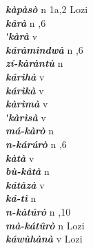 \begin{multicols}{2}
{{\bfseries\itshape kàpàsò}} \relax  n  \relax  1a,2  \relax  Lozi \relax  \\
{{\bfseries\itshape kârà}} \relax  n  ,6  \relax   \relax  \\
{{\bfseries\itshape ʹkàrà}} \relax  v  \relax   \relax  {} \relax   \relax  \\
{{\bfseries\itshape káràmìndwà}} \relax  n  ,6  \relax   \relax  \\
{{\bfseries\itshape zí-kàràntù}} \relax  n   \relax  {} \relax   \relax  \\
{{\bfseries\itshape kárìhà}} \relax  v  \relax   \relax  {} \relax   \relax  \\
{{\bfseries\itshape kárìkà}} \relax  v  \relax   \relax  {} \relax   \relax  \\
{{\bfseries\itshape kàrìmà}} \relax  v  \relax   \relax  {} \relax   \relax  \\
{{\bfseries\itshape ʹkàrìsà}} \relax  v  \relax   \relax  {} \relax   \relax  \\
{{\bfseries\itshape má-kàrò}} \relax  n   \relax  {} \relax   \relax  \\
{{\bfseries\itshape n-kárúrò}} \relax  n  ,6  \relax   \relax  \\
{{\bfseries\itshape kàtà}} \relax  v  \relax   \relax  {} \relax   \relax  \\
{{\bfseries\itshape bù-kâtà}} \relax  n   \relax  {} \relax   \relax  \\
{{\bfseries\itshape kátàzà}} \relax  v  \relax   \relax  {} \relax   \relax  \\
{{\bfseries\itshape ká-tì}} \relax  n   \relax  {} \relax   \relax  \\
{{\bfseries\itshape n-kàtúrò}} \relax  n  ,10  \relax   \relax  \\
{{\bfseries\itshape mà-kátûrò}} \relax  n   \relax  {} \relax  Lozi \relax  \\
{{\bfseries\itshape káwùhànà}} \relax  v  \relax   \relax  {} \relax  Lozi \relax  \\

\end{multicols}

